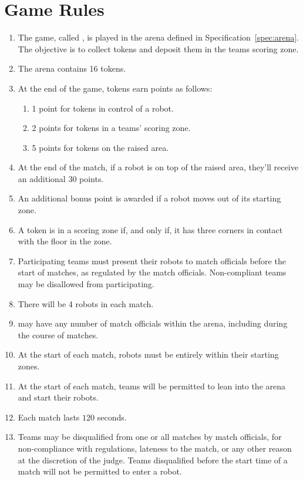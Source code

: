 \section{Game Rules}
\label{sec:rules}

\begin{enumerate}
  \item The game, called \emph{\gamename}, is played in the arena defined in
        Specification~\ref{spec:arena}. The objective is to collect tokens and
        deposit them in the teams scoring zone.
  \item The arena contains 16 tokens.
  \item At the end of the game, tokens earn points as follows:
    \begin{enumerate}
      \item 1 point for tokens in control of a robot.
      \item 2 points for tokens in a teams' scoring zone.
      \item 5 points for tokens on the raised area.
    \end{enumerate}
  \item At the end of the match, if a robot is on top of the raised area, they'll
        receive an additional 30 points.
  \item An additional bonus point is awarded if a robot moves out of its starting
        zone.
  \item A token is in a scoring zone if, and only if, it has three corners in contact
        with the floor in the zone.
  \item Participating teams must present their robots to match officials before
        the start of matches, as regulated by the match officials. Non-compliant
        teams may be disallowed from participating.
  \item There will be 4 robots in each match.
  \item \org may have any number of match officials within the arena, including
        during the course of matches.
  \item At the start of each match, robots must be entirely within their
        starting zones.
  \item At the start of each match, teams will be permitted to lean into the
        arena and start their robots.
  \item Each match lasts $120$ seconds.
  \item Teams may be disqualified from one or all matches by match officials,
        for non-compliance with regulations, lateness to the match, or any other
        reason at the discretion of the judge. Teams disqualified before the
        start time of a match will not be permitted to enter a robot.
\end{enumerate}
